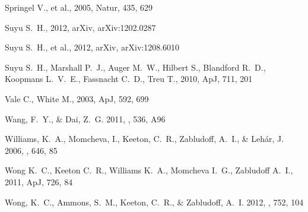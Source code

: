 \begin{thebibliography}{99}
 Springel V., et al., 2005, Natur, 435, 629 


 Suyu 
S.~H., 2012, arXiv, arXiv:1202.0287 


Suyu S.~H., et al., 2012, arXiv, arXiv:1208.6010 


Suyu S.~H., Marshall P.~J., Auger M.~W., Hilbert S., Blandford R.~D., 
Koopmans L.~V.~E., Fassnacht C.~D., Treu T., 2010, ApJ, 711, 201 


 Vale C., White M., 2003, ApJ, 592, 699 


{Wang}, F.~Y., \& {Dai}, Z.~G. 2011, \aap, 536, A96


{Williams}, K.~A., {Momcheva}, I., {Keeton}, C.~R., {Zabludoff}, A.~I., \&
  {Leh{\'a}r}, J. 2006, \apj, 646, 85


Wong K.~C., Keeton C.~R., Williams K.~A., Momcheva I.~G., Zabludoff A.~I., 
2011, ApJ, 726, 84 


{Wong}, K.~C., {Ammons}, S.~M., {Keeton}, C.~R., \& {Zabludoff}, A.~I. 2012,
  \apj, 752, 104


\end{thebibliography}

